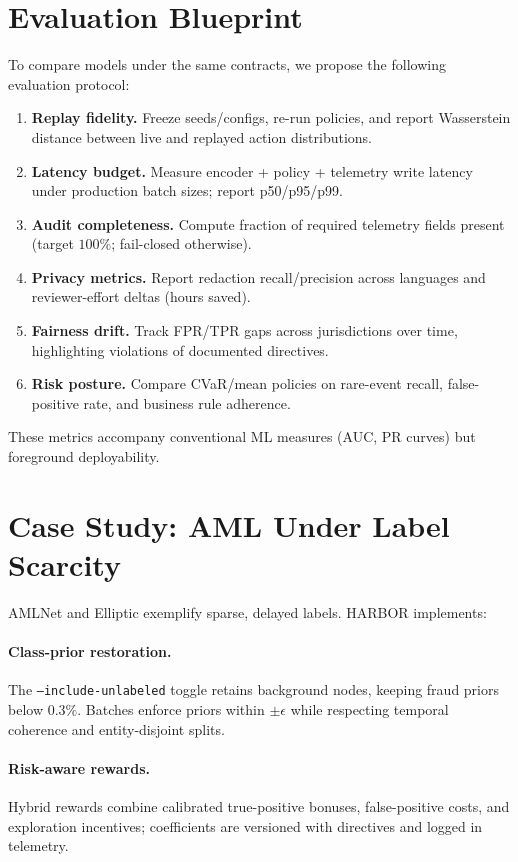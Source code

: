 \documentclass[letterpaper]{article}
\begin{document}
\section{Evaluation Blueprint}
\label{sec:evaluation}
To compare models under the same contracts, we propose the following evaluation protocol:
\begin{enumerate}
    \item \textbf{Replay fidelity.} Freeze seeds/configs, re-run policies, and report Wasserstein distance between live and replayed action distributions.
    \item \textbf{Latency budget.} Measure encoder + policy + telemetry write latency under production batch sizes; report p50/p95/p99.
    \item \textbf{Audit completeness.} Compute fraction of required telemetry fields present (target $100\%$; fail-closed otherwise).
    \item \textbf{Privacy metrics.} Report redaction recall/precision across languages and reviewer-effort deltas (hours saved).
    \item \textbf{Fairness drift.} Track FPR/TPR gaps across jurisdictions over time, highlighting violations of documented directives.
    \item \textbf{Risk posture.} Compare CVaR/mean policies on rare-event recall, false-positive rate, and business rule adherence.
\end{enumerate}
These metrics accompany conventional ML measures (AUC, PR curves) but foreground deployability.

\section{Case Study: AML Under Label Scarcity}
\label{sec:aml}
AMLNet and Elliptic exemplify sparse, delayed labels. HARBOR implements:
\paragraph{Class-prior restoration.} The \texttt{--include-unlabeled} toggle retains background nodes, keeping fraud priors below $0.3\%$. Batches enforce priors within $\pm\epsilon$ while respecting temporal coherence and entity-disjoint splits.
\paragraph{Risk-aware rewards.} Hybrid rewards combine calibrated true-positive bonuses, false-positive costs, and exploration incentives; coefficients are versioned with directives and logged in telemetry.
\end{document}
